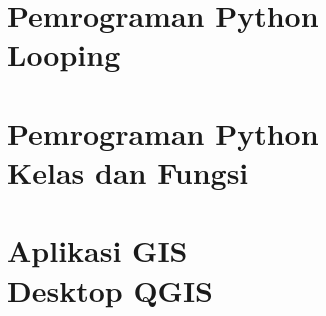 \documentclass{WileySix}
\begin{document}
\chapter[Looping]
{Pemrograman Python\\ Looping}


\chapter[Kelas dan Fungsi]
{Pemrograman Python\\ Kelas dan Fungsi}



\chapter[QGIS]
{Aplikasi GIS\\ Desktop QGIS}







\printindex
\end{document}
